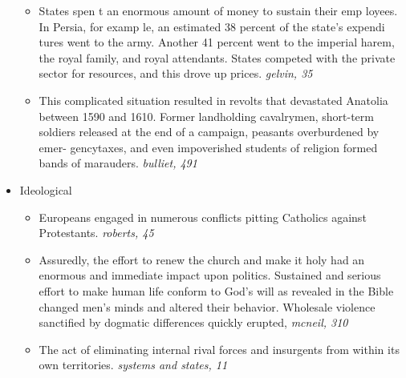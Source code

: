 \documentclass[letterpaper]{article}
\begin{document}
\begin{itemize}
\begin{itemize}
\item States spen t an enormous amount of money to sustain their emp
loyees. In Persia, for examp le, an estimated 38 percent of the
state's expendi tures went to the army. Another 41 percent went to
the imperial harem, the royal family, and royal attendants. States
competed with the private sector for resources, and this drove up
prices. \emph{gelvin, 35}

\item This complicated situation resulted in revolts that devastated
Anatolia between 1590 and 1610. Former landholding cavalrymen,
short-term soldiers released at the end of a campaign, peasants
overburdened by emer- gencytaxes, and even impoverished students of
religion formed bands of marauders. \emph{bulliet, 491}
\end{itemize}

\item Ideological

\begin{itemize}
\item Europeans engaged in numerous conflicts pitting Catholics against
Protestants. \emph{roberts, 45}
\item Assuredly, the effort to renew the church and make it holy had an
enormous and immediate impact upon politics. Sustained and serious
effort to make human life conform to God's will as revealed in the
Bible changed men's minds and altered their behavior. Wholesale
violence sanctified by dogmatic differences quickly erupted,
\emph{mcneil, 310}
\item The act of eliminating internal rival forces and insurgents from
within its own territories. \emph{systems and states, 11}
\end{itemize}
\end{itemize}
\end{document}
